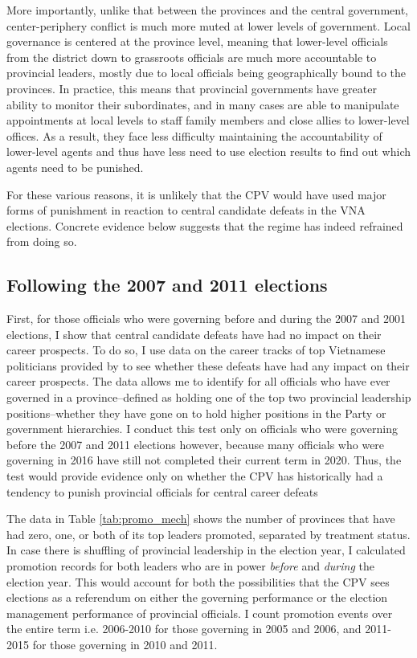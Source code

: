 \documentclass[12pt]{article}
\newcommand{\1}{\mathbbm{1}}
\begin{document}
More importantly, unlike that between the provinces and the central government, center-periphery conflict is much more muted at lower levels of government. Local governance is centered at the province level, meaning that lower-level officials from the district down to grassroots officials are much more accountable to provincial leaders, mostly due to local officials being geographically bound to the provinces. In practice, this means that provincial governments have greater ability to monitor their subordinates, and in many cases are able to manipulate appointments at local levels to staff family members and close allies to lower-level offices. As a result, they face less difficulty maintaining the accountability of lower-level agents and thus have less need to use election results to find out which agents need to be punished.

For these various reasons, it is unlikely that the CPV would have used major forms of punishment in reaction to central candidate defeats in the VNA elections. Concrete evidence below suggests that the regime has indeed refrained from doing so.

\subsection{Following the 2007 and 2011 elections}

First, for those officials who were governing before and during the 2007 and 2001 elections, I show that central candidate defeats have had no impact on their career prospects. To do so, I use data on the career tracks of top Vietnamese politicians provided by \citet{MaleskyPhan2017} to see whether these defeats have had any impact on their career prospects. The data allows me to identify for all officials who have ever governed in a province--defined as holding one of the top two provincial leadership positions--whether they have gone on to hold higher positions in the Party or government hierarchies. I conduct this test only on officials who were governing before the 2007 and 2011 elections however, because many officials who were governing in 2016 have still not completed their current term in 2020. Thus, the test would provide evidence only on whether the CPV has historically had a tendency to punish provincial officials for central career defeats

The data in Table \ref{tab:promo_mech} shows the number of provinces that have had zero, one, or both of its top leaders promoted, separated by treatment status. In case there is shuffling of provincial leadership in the election year, I calculated promotion records for both leaders who are in power \textit{before} and \textit{during} the election year. This would account for both the possibilities that the CPV sees elections as a referendum on either the governing performance or the election management performance of provincial officials. I count promotion events over the entire term i.e. 2006-2010 for those governing in 2005 and 2006, and 2011-2015 for those governing in 2010 and 2011.
\end{document}
